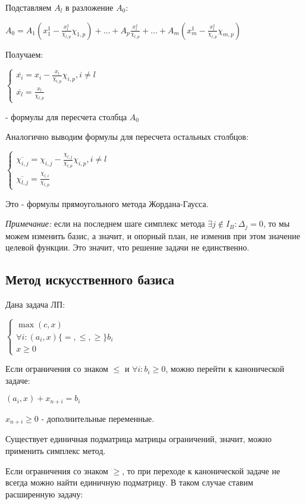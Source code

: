 \documentclass[11pt]{article}
\begin{document}
\begin{sloppypar}
Подставляем $A_l$ в разложение $A_0$:

$A_0 = A_1(x^1_1 - \frac{x^1_l}{\chi_{l, p}} \chi_{1, p}) + \dots + A_p \frac{x^1_l}{\chi_{l, p}} + \dots + A_m(x^1_m - \frac{x^1_l}{\chi_{l, p}} \chi_{m, p})$

Получаем:

$\begin{cases}
  \overline{x_i} = x_i - \frac{x_l}{\chi_{l, p}} \chi_{i, p}, i \neq l \\
  \overline{x_l} = \frac{x_l}{\chi_{l, p}}
\end{cases}$

- формулы для пересчета столбца $A_0$

Аналогично выводим формулы для пересчета остальных столбцов:

$\begin{cases}
  \overline{\chi_{i, j}} = \chi_{i, j} - \frac{\chi_{l, j}}{\chi_{l, p}} \chi_{i, p}, i \neq l \\
  \overline{\chi_{l, j}} = \frac{\chi_{l, i}}{\chi_{l, p}}
\end{cases}$

Это - формулы прямоугольного метода Жордана-Гаусса.

\textit{Примечание:} если на последнем шаге симплекс метода $\exists j \notin I_B: \Delta_j = 0$, то мы можем изменить базис, а значит, и опорный план, не изменив при этом значение целевой функции. Это значит, что решение задачи не единственно.

\subsection*{Метод искусственного базиса}
Дана задача ЛП:

$\begin{cases}
  \max (c, x) \\
  \forall i: (a_i, x) \{=, \leq, \geq\} b_i \\
  x \geq 0
\end{cases}$

Если ограничения со знаком $\leq$ и $\forall i: b_i \geq 0$, можно перейти к канонической задаче:

$(a_i, x) + x_{n + i} = b_i$

$x_{n + i} \geq 0$ - дополнительные переменные.

Существует единичная подматрица матрицы ограничений, значит, можно применить симплекс метод.

Если ограничения со знаком $\geq$, то при переходе к канонической задаче не всегда можно найти единичную подматрицу. В таком случае ставим расширенную задачу:


\end{sloppypar}
\end{document}
